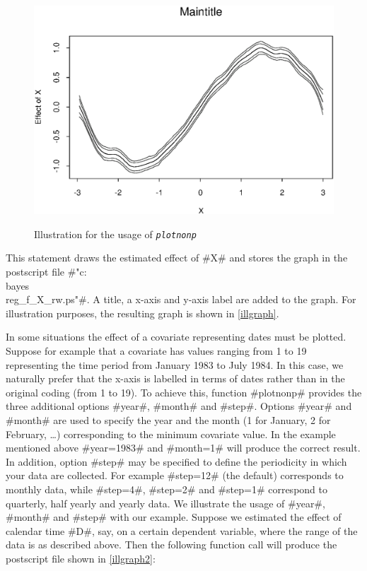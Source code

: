 \begin{figure}[ht]
\begin{center}
\includegraphics[scale=0.8]{grafiken/plotnonp.eps}
{\em\caption{ \label{illgraph} Illustration for the usage of
\em\tt plotnonp}}
\end{center}
\end{figure}

This statement draws the estimated effect of #X# and stores the
graph in the postscript file #"c:\\bayes\\reg_f_X_rw.ps"#. A
title, a x-axis and y-axis label are added to the graph. For
illustration purposes, the resulting graph is shown in
\autoref{illgraph}.

In some situations the effect of a covariate representing dates must
be plotted. Suppose for example that a covariate has values ranging
from 1 to 19 representing the time period from January 1983 to July
1984. In this case, we naturally prefer that the x-axis is labelled
in terms of dates rather than in the original coding (from 1 to 19).
To achieve this, function #plotnonp# provides the three additional
options #year#, #month# and #step#. Options #year# and #month# are
used to specify the year and the month (1 for January, 2 for
February, \dots) corresponding to the minimum covariate value. In
the example mentioned above #year=1983# and #month=1# will produce
the correct result. In addition, option #step# may be specified to
define the periodicity in which your data are collected. For example
#step=12# (the default) corresponds to monthly data, while #step=4#,
#step=2# and #step=1# correspond to quarterly, half yearly and
yearly data. We illustrate the usage of #year#, #month# and #step#
with our example. Suppose we estimated the effect of calendar time
#D#, say, on a certain dependent variable, where the range of the
data is as described above. Then the following function call will
produce the postscript file shown in \autoref{illgraph2}:

